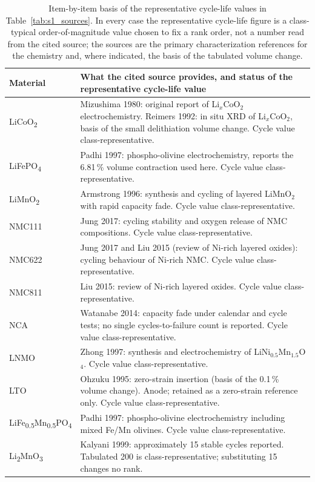 \documentclass[10pt]{article}
\begin{document}
\begin{table}[htbp]
\centering
\caption{Item-by-item basis of the representative cycle-life values in Table~\ref{tab:s1_sources}. In every case the representative cycle-life figure is a class-typical order-of-magnitude value chosen to fix a rank order, not a number read from the cited source; the sources are the primary characterization references for the chemistry and, where indicated, the basis of the tabulated volume change.}
\label{tab:s1b_notes}
\setlength{\tabcolsep}{5pt}
\renewcommand{\arraystretch}{1.25}
\footnotesize
\begin{tabular}{l p{12.5cm}}
\hline
\textbf{Material} & \textbf{What the cited source provides, and status of the representative cycle-life value} \\
\hline
LiCoO\textsubscript{2} & Mizushima 1980: original report of Li$_x$CoO$_2$ electrochemistry. Reimers 1992: in situ XRD of Li$_x$CoO$_2$, basis of the small delithiation volume change. Cycle value class-representative. \\
LiFePO\textsubscript{4} & Padhi 1997: phospho-olivine electrochemistry, reports the 6.81\,\% volume contraction used here. Cycle value class-representative. \\
LiMnO\textsubscript{2} & Armstrong 1996: synthesis and cycling of layered LiMnO$_2$ with rapid capacity fade. Cycle value class-representative. \\
NMC111 & Jung 2017: cycling stability and oxygen release of NMC compositions. Cycle value class-representative. \\
NMC622 & Jung 2017 and Liu 2015 (review of Ni-rich layered oxides): cycling behaviour of Ni-rich NMC. Cycle value class-representative. \\
NMC811 & Liu 2015: review of Ni-rich layered oxides. Cycle value class-representative. \\
NCA & Watanabe 2014: capacity fade under calendar and cycle tests; no single cycles-to-failure count is reported. Cycle value class-representative. \\
LNMO & Zhong 1997: synthesis and electrochemistry of LiNi$_{0.5}$Mn$_{1.5}$O$_4$. Cycle value class-representative. \\
LTO & Ohzuku 1995: zero-strain insertion (basis of the 0.1\,\% volume change). Anode; retained as a zero-strain reference only. Cycle value class-representative. \\
LiFe\textsubscript{0.5}Mn\textsubscript{0.5}PO\textsubscript{4} & Padhi 1997: phospho-olivine electrochemistry including mixed Fe/Mn olivines. Cycle value class-representative. \\
Li\textsubscript{2}MnO\textsubscript{3} & Kalyani 1999: approximately 15 stable cycles reported. Tabulated 200 is class-representative; substituting 15 changes no rank. \\
\hline
\end{tabular}
\end{table}
\end{document}
